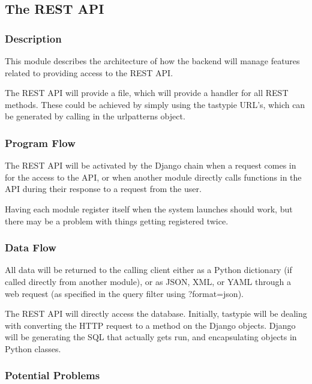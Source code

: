 
\subsection{The REST API}

\subsubsection{Description}

This module describes the architecture of how the backend will manage features related to providing access to the REST API.

The REST API will provide a  file, which will provide a handler for all REST methods.
These could be achieved by simply using the tastypie URL's, which can be generated by calling  in the urlpatterns object.

\subsubsection{Program Flow}

The REST API will be activated by the Django chain when a request comes in for the access to the API, or when another module directly calls functions in the API during their response to a request from the user.

Having each module register itself when the system launches should work, but there may be a problem with things getting registered twice.


\subsubsection{Data Flow}

All data will be returned to the calling client either as a Python dictionary (if called directly from another module), or as JSON, XML, or YAML through a web request (as specified in the query filter using ?format=json).

The REST API will directly access the database.
Initially, tastypie will be dealing with converting the HTTP request to a method on the Django objects.
Django will be generating the SQL that actually gets run, and encapsulating objects in Python classes.


\subsubsection{Potential Problems}

